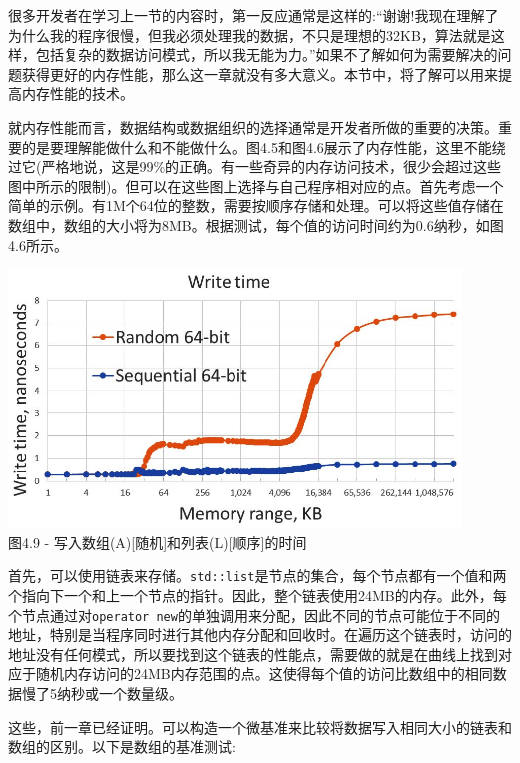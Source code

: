 
很多开发者在学习上一节的内容时，第一反应通常是这样的:“谢谢!我现在理解了为什么我的程序很慢，但我必须处理我的数据，不只是理想的32KB，算法就是这样，包括复杂的数据访问模式，所以我无能为力。”如果不了解如何为需要解决的问题获得更好的内存性能，那么这一章就没有多大意义。本节中，将了解可以用来提高内存性能的技术。


就内存性能而言，数据结构或数据组织的选择通常是开发者所做的重要的决策。重要的是要理解能做什么和不能做什么。图4.5和图4.6展示了内存性能，这里不能绕过它(严格地说，这是99\%的正确。有一些奇异的内存访问技术，很少会超过这些图中所示的限制)。但可以在这些图上选择与自己程序相对应的点。首先考虑一个简单的示例。有1M个64位的整数，需要按顺序存储和处理。可以将这些值存储在数组中，数组的大小将为8MB。根据测试，每个值的访问时间约为0.6纳秒，如图4.6所示。

\begin{center}
\includegraphics[width=0.9\textwidth]{content/1/chapter4/images/9.jpg}\\
图4.9 - 写入数组(A)[随机]和列表(L)[顺序]的时间
\end{center}

首先，可以使用链表来存储。\texttt{std::list}是节点的集合，每个节点都有一个值和两个指向下一个和上一个节点的指针。因此，整个链表使用24MB的内存。此外，每个节点通过对\texttt{operator new}的单独调用来分配，因此不同的节点可能位于不同的地址，特别是当程序同时进行其他内存分配和回收时。在遍历这个链表时，访问的地址没有任何模式，所以要找到这个链表的性能点，需要做的就是在曲线上找到对应于随机内存访问的24MB内存范围的点。这使得每个值的访问比数组中的相同数据慢了5纳秒或一个数量级。

这些，前一章已经证明。可以构造一个微基准来比较将数据写入相同大小的链表和数组的区别。以下是数组的基准测试:

